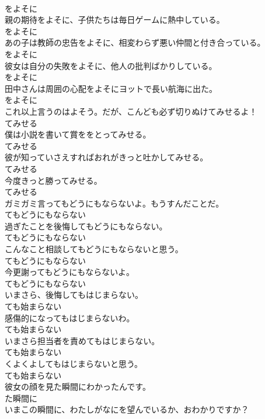 \documentclass[8pt]{extreport}
\begin{document}
\begin{CJK}{UTF8}{min}
\\	をよそに	
\\	親の期待をよそに、子供たちは毎日ゲームに熱中している。	
\\	をよそに	
\\	あの子は教師の忠告をよそに、相変わらず悪い仲間と付き合っている。	
\\	をよそに	
\\	彼女は自分の失敗をよそに、他人の批判ばかりしている。	
\\	をよそに	
\\	田中さんは周囲の心配をよそにヨットで長い航海に出た。	
\\	をよそに	
\\	これ以上言うのはよそう。だが、こんども必ず切りぬけてみせるよ！	
\\	てみせる	
\\	僕は小説を書いて賞ををとってみせる。	
\\	てみせる	
\\	彼が知っていさえすればおれがきっと吐かしてみせる。	
\\	てみせる	
\\	今度きっと勝ってみせる。	
\\	てみせる	
\\	ガミガミ言ってもどうにもならないよ。もうすんだことだ。	
\\	てもどうにもならない	
\\	過ぎたことを後悔してもどうにもならない。	
\\	てもどうにもならない	
\\	こんなこと相談してもどうにもならないと思う。	
\\	てもどうにもならない	
\\	今更謝ってもどうにもならないよ。	
\\	てもどうにもならない	
\\	いまさら、後悔してもはじまらない。	
\\	ても始まらない	
\\	感傷的になってもはじまらないわ。	
\\	ても始まらない	
\\	いまさら担当者を責めてもはじまらない。	
\\	ても始まらない	
\\	くよくよしてもはじまらないと思う。	
\\	ても始まらない	
\\	彼女の顔を見た瞬間にわかったんです。	
\\	た瞬間に	
\\	いまこの瞬間に、わたしがなにを望んでいるか、おわかりですか？	

\end{CJK}
\end{document}
